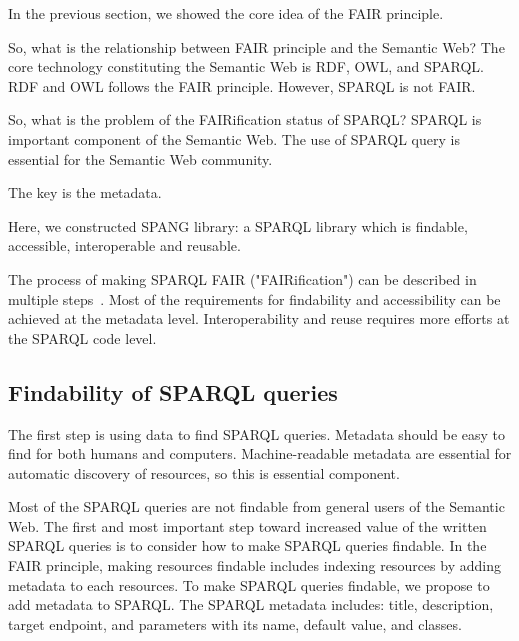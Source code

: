 \documentclass[runningheads]{llncs}
\begin{document}
In the previous section, we showed the core idea of the FAIR principle.

So, what is the relationship between FAIR principle and the Semantic Web?
The core technology constituting the Semantic Web is RDF, OWL, and SPARQL. RDF and OWL follows the FAIR principle. However, SPARQL is not FAIR.

So, what is the problem of the FAIRification status of SPARQL?
SPARQL is important component of the Semantic Web. The use of SPARQL query is essential for the Semantic Web community.

The key is the metadata.

Here, we constructed SPANG library: a SPARQL library which is findable, accessible, interoperable and reusable.

The process of making SPARQL FAIR ("FAIRification") can be described in multiple steps~\cite{fairification}.
Most of the requirements for findability and accessibility can be achieved at the metadata level. Interoperability and reuse requires more efforts at the SPARQL code level.


\subsection{Findability of SPARQL queries}
The first step is using data to find SPARQL queries. Metadata should be easy to find for both humans and computers. Machine-readable metadata are essential for automatic discovery of resources, so this is essential component.

Most of the SPARQL queries are not findable from general users of the Semantic Web. The first and most important step toward increased value of the written SPARQL queries is to consider how to make SPARQL queries findable.
In the FAIR principle, making resources findable includes indexing resources by adding metadata to each resources. 
To make SPARQL queries findable, we propose to add metadata to SPARQL.
The SPARQL metadata includes: title, description, target endpoint, and parameters with its name, default value, and classes.
\end{document}
